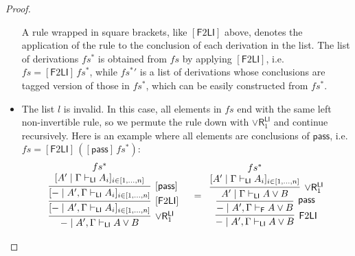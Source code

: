 \documentclass[submission,copyright,creativecommons]{eptcs}
\theoremstyle{definition}
\newcommand{\pass}{\mathsf{pass}}
\newcommand{\andlone}{\land \mathsf{L}_{1}}
\newcommand{\orrone}{\lor \mathsf{R}_{1}}
\newcommand{\LI}{\mathsf{LI}}
\newcommand{\F}{\mathsf{F}}
\newcommand{\tCone}{\mathbb{C}_1}
\newcommand{\proofbox}[1]{\begin{tabular}{l} #1 \end{tabular}}
\begin{document}
\begin{proof}
\begin{itemize}
      A rule wrapped in square brackets, like $[\F 2 \LI]$ above, denotes the application of the rule to the conclusion of each derivation in the list.
      The list of derivations $fs^{*}$ is obtained from $fs$ by applying $[\F 2 \LI]$, i.e. $fs = [\F 2 \LI]\,fs^*$, while ${fs^*}'$ is a list of derivations whose conclusions are tagged version of those in $fs^{*}$, which can be easily constructed from $fs^{*}$.
      \item The list $l$ is invalid. In this case, all elements in $fs$ end with the same left non-invertible rule, so we permute the rule down with $\orrone^{\LI}$ and continue recursively.
      Here is an example where all elements are conclusions of $\pass$, i.e. $fs = [\F 2 \LI] \,([\pass]\,fs^*)$:
      \begin{displaymath}
        \begin{array}{cc}
          \proofbox{
            \infer[\orrone^{\LI}]{- \mid A' , \Gamma \vdash_{\LI} A \lor B}{
              \infer[ {[\F 2 \LI]} ]{[- \mid A' , \Gamma \vdash_{\LI} A_i]_{i \in [1 , \dots , n]}}{
                \infer[ {[\pass]} ]{[- \mid A' , \Gamma \vdash_{\LI} A_i]_{i \in [1 , \dots , n]}}{
                  \deduce{[A' \mid \Gamma \vdash_{\LI} A_i]_{i \in [1 , \dots , n]}}{fs^{*}}
                }
              }
            }
          }
          &
          =
          \proofbox{
            \infer[\F 2 \LI]{- \mid A' , \Gamma \vdash_{\LI} A \lor B}{
              \infer[\pass]{- \mid A' , \Gamma \vdash_{\F} A \lor B}{
                \infer[\orrone^{\LI}]{A' \mid \Gamma \vdash_{\LI} A \lor B}{
                  \deduce{[A' \mid \Gamma \vdash_{\LI} A_i]_{i \in [1 , \dots , n]}}{fs^{*}}
                }
}}}
\end{array}
\end{displaymath}
\end{itemize}
\end{proof}
\end{document}
